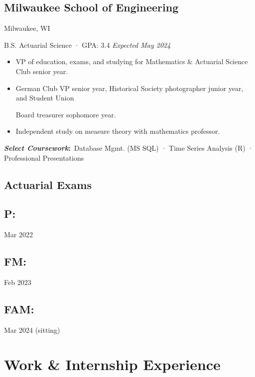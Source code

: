 \documentclass[12pt]{article}
\newcommand{\itemspace}{\vspace{0.1870em}}
\renewcommand{\textsc}[1]{\uppercase{\footnotesize#1}\normalsize}
\newcommand\textbox[1]
    {\parbox{.375\textwidth}{#1}} %
\begin{document}
\subsection{Milwaukee School of Engineering} \hfill Milwaukee, WI

B.S. Actuarial Science · GPA: 3.4 \hfill \textit{Expected May 2024}

\begin{itemize}[noitemsep,nolistsep]
  \item VP of education, exams, and studying for Mathematics \& Actuarial
    Science Club senior year.

  \item German Club VP senior year, Historical Society photographer junior
    year, and Student Union

    Board treasurer sophomore year.

  \item Independent study on measure theory with mathematics professor.
\end{itemize}

\textbf{\textit{Select Coursework}:} \,Database Mgmt. (\textsc{ms sql}) ·
Time Series Analysis (\textsc{R}) · Professional Presentations

\itemspace

\subsection{Actuarial Exams} \hfill


\textbox{\subsection{P:} {Mar 2022}\hfill}
\textbox{\hfil \subsection{FM:} {Feb 2023}}
\textbox{\hfill\subsection{FAM:} {Mar 2024 (sitting)}}

\itemspace

\section{Work \& Internship Experience}
\end{document}
